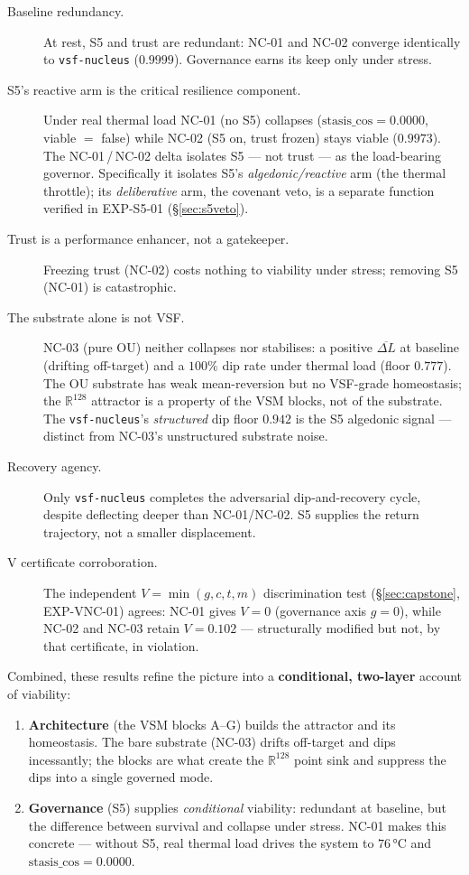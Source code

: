 \documentclass[11pt, a4paper]{article}
\newcommand{\nucleus}{\texttt{vsf-nucleus}}
\begin{document}
\begin{description}
  \item[Baseline redundancy.] At rest, S5 and trust are redundant: NC-01 and
    NC-02 converge identically to \nucleus{} ($0.9999$). Governance earns its
    keep only under stress.
  \item[S5's reactive arm is the critical resilience component.] Under real thermal
    load NC-01 (no S5) collapses ($\text{stasis\_cos}=0.0000$, viable $=$ false)
    while NC-02 (S5 on, trust frozen) stays viable ($0.9973$). The NC-01\,/\,NC-02
    delta isolates S5 --- not trust --- as the load-bearing governor. Specifically it
    isolates S5's \emph{algedonic/reactive} arm (the thermal throttle); its
    \emph{deliberative} arm, the covenant veto, is a separate function verified in
    EXP-S5-01 (\S\ref{sec:s5veto}).
  \item[Trust is a performance enhancer, not a gatekeeper.] Freezing trust
    (NC-02) costs nothing to viability under stress; removing S5 (NC-01) is
    catastrophic.
  \item[The substrate alone is not VSF.] NC-03 (pure OU) neither collapses nor
    stabilises: a positive $\overline{\Delta L}$ at baseline (drifting
    off-target) and a $100\%$ dip rate under thermal load (floor $0.777$). The
    OU substrate has weak mean-reversion but no VSF-grade homeostasis; the
    $\mathbb{R}^{128}$ attractor is a property of the VSM blocks, not of the
    substrate. The \nucleus{}'s \emph{structured} dip floor $0.942$ is the S5
    algedonic signal --- distinct from NC-03's unstructured substrate noise.
  \item[Recovery agency.] Only \nucleus{} completes the adversarial
    dip-and-recovery cycle, despite deflecting deeper than NC-01/NC-02. S5
    supplies the return trajectory, not a smaller displacement.
  \item[V certificate corroboration.] The independent $V=\min(g,c,t,m)$
    discrimination test (\S\ref{sec:capstone}, EXP-VNC-01) agrees: NC-01 gives
    $V=0$ (governance axis $g=0$), while NC-02 and NC-03 retain $V=0.102$ ---
    structurally modified but not, by that certificate, in violation.
\end{description}

Combined, these results refine the picture into a \textbf{conditional,
two-layer} account of viability:
\begin{enumerate}
  \item \textbf{Architecture} (the VSM blocks A--G) builds the attractor and its
    homeostasis. The bare substrate (NC-03) drifts off-target and dips
    incessantly; the blocks are what create the $\mathbb{R}^{128}$ point sink and
    suppress the dips into a single governed mode.
  \item \textbf{Governance} (S5) supplies \emph{conditional} viability: redundant
    at baseline, but the difference between survival and collapse under stress.
    NC-01 makes this concrete --- without S5, real thermal load drives the system
    to $76$\,°C and $\text{stasis\_cos}=0.0000$.
\end{enumerate}
\end{document}

